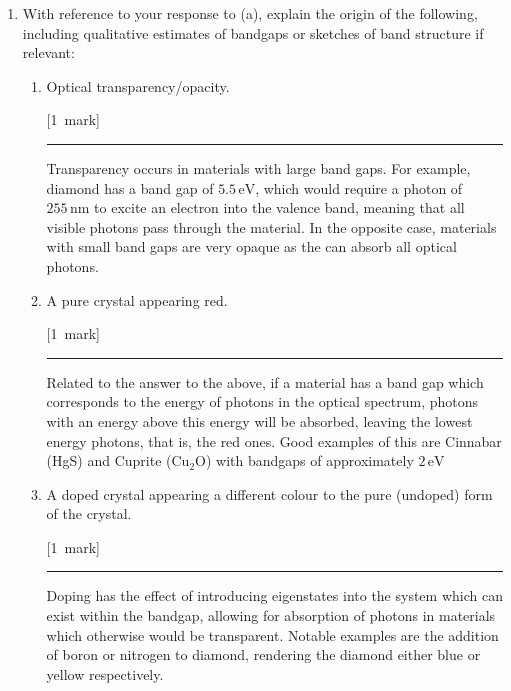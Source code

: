 \documentclass[12pt,a4paper]{article}
\newcommand{\unit}[1]{\ensuremath{\, \mathrm{#1}}}
\newcommand{\sepline}[0]{\par \hfil\rule{10cm}{0.4pt} \vspace*{\parskip}\hfil}
\begin{document}
\begin{enumerate}
\begin{enumerate}
\begin{answer}
					\end{answer}

					\item With reference to your response to (a), explain the origin of the following, including qualitative estimates of bandgaps or sketches of band structure if relevant:

					\begin{enumerate}
						\item Optical transparency/opacity.

						\hfill{[1~mark]}

						\begin{answer}

							\sepline

							Transparency occurs in materials with large band gaps. For example, diamond has a band gap of $5.5\unit{eV}$, which would require a photon of $255\unit{nm}$ to excite an electron into the valence band, meaning that all visible photons pass through the material. In the opposite case, materials with small band gaps are very opaque as the can absorb all optical photons.

						\end{answer}

						\item A pure crystal appearing red.

						\hfill{[1~mark]}

						\begin{answer}

							\sepline

							Related to the answer to the above, if a material has a band gap which corresponds to the energy of photons in the optical spectrum, photons with an energy above this energy will be absorbed, leaving the lowest energy photons, that is, the red ones. Good examples of this are Cinnabar (HgS) and Cuprite (Cu$_2$O) with bandgaps of approximately $2\unit{eV}$

						\end{answer}

						\item A doped crystal appearing a different colour to the pure (undoped) form of the crystal.

						\hfill{[1~mark]}

						\begin{answer}

							\sepline

							Doping has the effect of introducing eigenstates into the system which can exist within the bandgap, allowing for absorption of photons in materials which otherwise would be transparent. Notable examples are the addition of boron or nitrogen to diamond, rendering the diamond either blue or yellow respectively.


\end{answer}
\end{enumerate}
\end{enumerate}
\end{enumerate}
\end{document}
